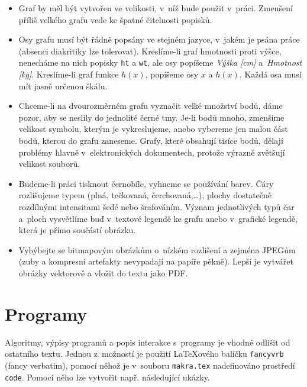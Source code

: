 \begin{itemize}
      \item Graf by měl být vytvořen ve velikosti, v~níž bude použit
            v~práci. Zmenšení příliš velkého grafu vede ke špatné čitelnosti
            popisků.
      \item Osy grafu musí být řádně popsány ve stejném jazyce, v~jakém je
            psána práce (absenci diakritiky lze tolerovat). Kreslíme-li graf
            hmotnosti proti výšce, nenecháme na nich popisky \texttt{ht} a
            \texttt{wt}, ale osy popíšeme \emph{Výška [cm]} a~\emph{Hmotnost
                        [kg]}. Kreslíme-li graf funkce $h(x)$, popíšeme osy $x$ a $h(x)$.
            Každá osa musí mít jasně určenou škálu.
      \item Chceme-li na dvourozměrném grafu vyznačit velké množství bodů,
            dáme pozor, aby se neslily do jednolité černé tmy. Je-li bodů mnoho,
            zmenšíme velikost symbolu, kterým je vykreslujeme, anebo vybereme
            jen malou část bodů, kterou do grafu zaneseme. Grafy, které obsahují
            tisíce bodů, dělají problémy hlavně v~elektronických dokumentech,
            protože výrazně zvětšují velikost souborů.
      \item Budeme-li práci tisknout černobíle, vyhneme se používání barev.
            Čáry roz\-li\-šu\-je\-me typem (plná, tečkovaná, čerchovaná,\ldots), plochy
            dostatečně roz\-díl\-ný\-mi intensitami šedé nebo šrafováním. Význam
            jednotlivých typů čar a~ploch vysvětlíme buď v~textové legendě ke
            grafu anebo v~grafické legendě, která je přímo součástí obrázku.
      \item Vyhýbejte se bitmapovým obrázkům o~nízkém rozlišení a zejména
            JPEGům (zuby a kompresní artefakty nevypadají na papíře pěkně).
            Lepší je vytvářet obrázky vektorově a vložit do textu jako PDF.
\end{itemize}

\section{Programy}

Algoritmy, výpisy programů a popis interakce s~programy je vhodné
odlišit od ostatního textu. Jednou z~možností je použití {\LaTeX}o\-vé\-ho balíčku
\texttt{fancyvrb} (fancy verbatim), pomocí něhož je v~souboru \texttt{makra.tex}
nadefinováno prostředí \texttt{code}. Pomocí něho lze vytvořit
např. následující ukázky.

